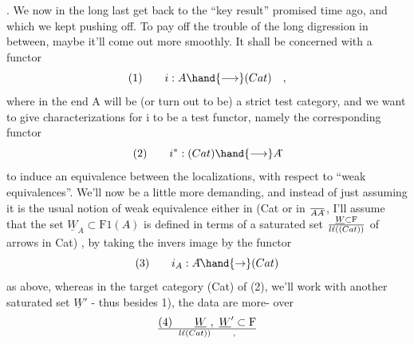 . We now in the long last get back to the ``key result'' promised time
ago, and which we kept pushing off. To pay off the trouble of the long
digression in between, maybe it'll come out more smoothly. It shall be
concerned with a functor
\[ (1) \qquad i : A \hand{\longrightarrow} (Cat) \quad , \]
where in the end A will be (or turn out to be) a strict test category,
and we want to give characterizations for i to be a  test functor, namely
the corresponding functor
\[ (2) \qquad i^{*} : (Cat) \hand{\longrightarrow} A\hat{} \]
to induce an equivalence between the localizations, with respect to
``weak equivalences''.\hand{*} We'll now be a little more demanding, and instead 
of just assuming it is the usual notion of weak equivalence either in (Cat\hand{)}
or in $\over{A}{A}\hat{}$, I'll assume that the set $\underline{W}_A \subset \mathrm{F1}(A\hat{})$ is defined in terms of
a saturated set $\underline{W} \subset \mathrm{F}\over{l}{\ell}((Cat))$ of arrows in \hand{(}Cat) , by taking the invers
image by the functor
\[ (3) \qquad i_A : A\hat{} \hand{\rightarrow} (Cat) \]
as above, whereas in the target category (Cat) of (2), we'll work
with another saturated set $\underline{W}'$ - thus besides \over{\unsure{(}}{(}1), the data are more-%
over
\[ (4) \qquad \underline{W} \ , \ \underline{W}' \subset \mathrm{F}\over{l}{\ell}(Cat)) \qquad , \]

